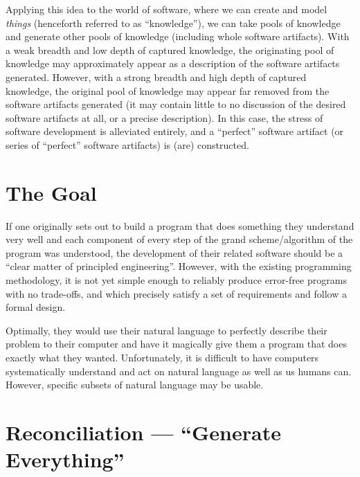 Applying this idea to the world of software, where we can create and model
\textit{things} (henceforth referred to as ``knowledge''), we can take pools of
knowledge and generate other pools of knowledge (including whole software
artifacts).  With a weak breadth and low depth of
captured knowledge, the originating pool of knowledge may approximately appear
as a description of the software artifacts generated. However, with a strong
breadth and high depth of captured knowledge, the original pool of knowledge may
appear far removed from the software artifacts generated (it may contain little
to no discussion of the desired software artifacts at all, or a precise
description). In this case, the stress of software development is alleviated
entirely, and a ``perfect'' software artifact (or series of ``perfect'' software
artifacts) is (are) constructed.

\section{The Goal}
\label{sec:idlgy:the_goal}

If one originally sets out to build a program that does something they
understand very well and each component of every step of the grand
scheme/algorithm of the program was understood, the development of their related
software should be a ``clear matter of principled engineering''. However,
with the existing programming methodology, it is not yet simple enough to
reliably produce error-free programs with no trade-offs, and which precisely
satisfy a set of requirements and follow a formal design.

Optimally, they would use their natural language to perfectly describe their
problem to their computer and have it magically give them a program that does
exactly what they wanted. Unfortunately, it is difficult to have computers
systematically understand and act on natural language as well as us humans can.
However, specific subsets of natural language may be usable.

\section{Reconciliation — ``Generate Everything''}
\label{sec:idlgy:generate_everything}

